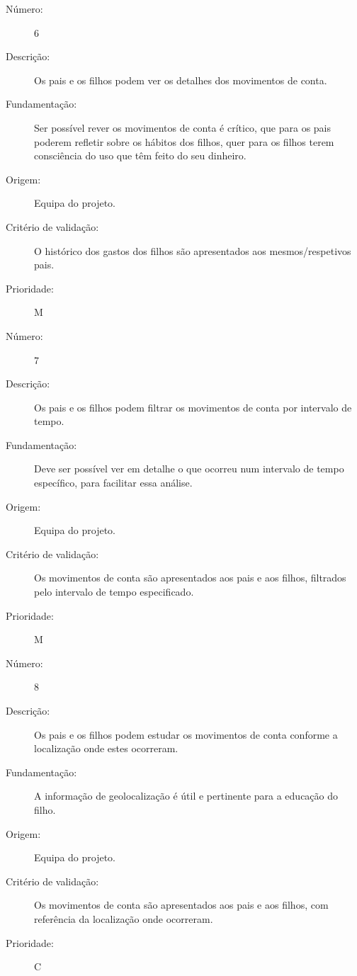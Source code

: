 \documentclass{article}
\begin{document}
            \begin{description}
        \item[Número:]6
        \item[Descrição:]Os pais e os filhos podem ver os detalhes dos movimentos de conta.
        \item[Fundamentação:]Ser possível rever os movimentos de conta é crítico, que para os pais poderem refletir sobre os hábitos dos filhos, quer para os filhos terem consciência do uso que têm feito do seu dinheiro.
        \item[Origem:]Equipa do projeto.
        \item[Critério de validação:]O histórico dos gastos dos filhos são apresentados aos mesmos/respetivos pais.
        \item[Prioridade:]M
      \end{description}
\vspace{0.5cm}

            \begin{description}
        \item[Número:]7
        \item[Descrição:]Os pais e os filhos podem filtrar os movimentos de conta por intervalo de tempo. 
        \item[Fundamentação:]Deve ser possível ver em detalhe o que ocorreu num intervalo de tempo específico, para facilitar essa análise.
        \item[Origem:]Equipa do projeto.
        \item[Critério de validação:] Os movimentos de conta são apresentados aos pais e aos filhos, filtrados pelo intervalo de tempo especificado.
        \item[Prioridade:]M
      \end{description}
\vspace{0.5cm}

            \begin{description}
        \item[Número:]8
        \item[Descrição:]Os pais e os filhos podem estudar os movimentos de conta conforme a localização onde estes ocorreram. 
        \item[Fundamentação:]A informação de geolocalização é útil e pertinente para a educação do filho.
        \item[Origem:]Equipa do projeto.
        \item[Critério de validação:]Os movimentos de conta são apresentados aos pais e aos filhos, com referência da localização onde ocorreram.
        \item[Prioridade:]C
      \end{description}
\vspace{0.5cm}
\end{document}
